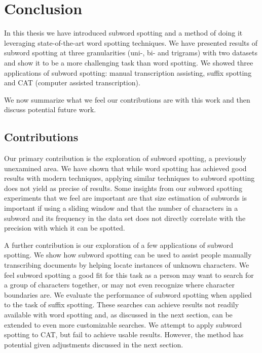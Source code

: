 \documentclass[ms,electronic,twosidetoc,letterpaper,chaptercenter,parttop,lof,lot]{byumsphd}
\begin{document}




\chapter{Conclusion}

In this thesis we have introduced subword spotting and a method of doing it leveraging state-of-the-art word spotting techniques. We have presented results of subword spotting at three granularities (uni-, bi- and trigrams) with two datasets and show it to be a more challenging task than word spotting. We showed three applications of subword spotting: manual transcription assisting, suffix spotting and CAT (computer assisted transcription).

We now summarize what we feel our contributions are with this work and then discuss potential future work.

\section{Contributions}


Our primary contribution is the exploration of subword spotting, a previously unexamined area. We have shown that while word spotting has achieved good results with modern techniques, applying similar techniques to subword spotting does not yield as precise of results.
Some insights from our subword spotting experiments that we feel are important are that 
size estimation of subwords is important if using a sliding window
and that
the number of characters in a subword  and its frequency in the data set does not directly correlate with the precision with which it can be spotted.

A further contribution is our exploration of a few applications of subword spotting.
We show how subword spotting can be used to assist people manually transcribing documents by helping locate instances of unknown characters. We feel subword spotting a good fit for this task as a person may want to search for a group of characters together, or may not even recognize where character boundaries are.
We evaluate the performance of subword spotting when applied to the task of suffix spotting. 
These searches can achieve results not readily available with word spotting and, as discussed in the next section, can be extended to even more customizable searches.
We attempt to apply subword spotting to CAT, but fail to achieve usable results. However, the method has potential given adjustments discussed in the next section.
\end{document}

